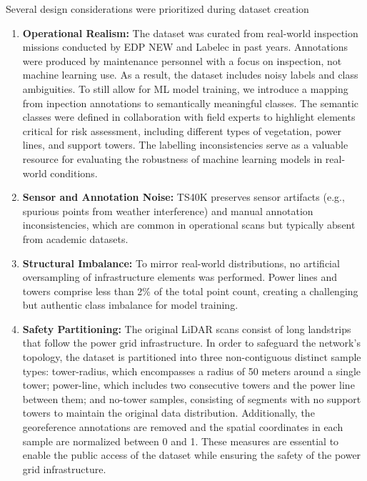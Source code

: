 Several design considerations were prioritized during dataset creation
%
\begin{enumerate}
      \item \textbf{Operational Realism:}
            The dataset was curated from real-world inspection missions conducted by
            EDP NEW and Labelec in past years. Annotations were produced by maintenance
            personnel with a focus on inspection, not machine learning
            use.
            As a result, the dataset includes noisy labels and class ambiguities.
            To still allow for ML model training, we introduce a mapping from inpection
            annotations to semantically meaningful classes. The semantic classes were defined
            in collaboration with field experts to highlight elements critical for risk
            assessment, including different types of vegetation, power lines,
            and support towers.
            The labelling inconsistencies serve as a valuable resource for
            evaluating the robustness of machine learning models in real-world
            conditions.
      \item \textbf{Sensor and Annotation Noise:}
            TS40K preserves sensor artifacts (e.g., spurious points from weather interference)
            and manual annotation inconsistencies, which are common in operational scans but
            typically absent from academic datasets.
      \item \textbf{Structural Imbalance:}
            To mirror real-world distributions,
            no artificial oversampling of infrastructure elements was performed.
            Power lines and towers comprise less than 2\% of the total point count,
            creating a challenging but authentic class imbalance for model training.
      \item \textbf{Safety Partitioning:}
            The original LiDAR scans consist of long landstrips that follow the
            power grid infrastructure. In order to safeguard the network's topology,
            the dataset is partitioned into three non-contiguous distinct sample types:
            tower-radius, which encompasses a radius of 50 meters around a single tower;
            power-line, which includes two consecutive towers and the power line between them;
            and no-tower samples, consisting of segments with no support towers to maintain
            the original data distribution.
            Additionally, the georeference annotations are removed and the spatial
            coordinates in each sample are normalized between 0 and 1.
            These measures are essential to enable the public access of the dataset while
            ensuring the safety of the power grid infrastructure.

\end{enumerate}

